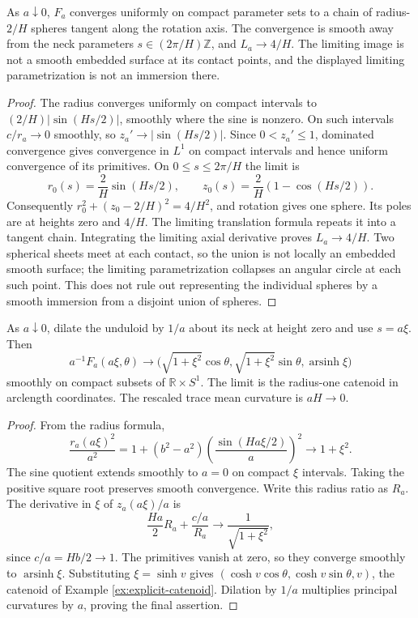 \begin{proposition}\label{prop:unduloid-sphere-chain-limit}
As $a\downarrow0$, $F_a$ converges uniformly on compact parameter sets to a chain of radius-$2/H$ spheres tangent along the rotation axis. The convergence is smooth away from the neck parameters $s\in(2\pi/H)\mathbb Z$, and $L_a\to4/H$. The limiting image is not a smooth embedded surface at its contact points, and the displayed limiting parametrization is not an immersion there.
\end{proposition}
\begin{proof}
The radius converges uniformly on compact intervals to $(2/H)|\sin(Hs/2)|$, smoothly where the sine is nonzero. On such intervals $c/r_a\to0$ smoothly, so $z_a'\to|\sin(Hs/2)|$. Since $0<z_a'\le1$, dominated convergence gives convergence in $L^1$ on compact intervals and hence uniform convergence of its primitives. On $0\le s\le2\pi/H$ the limit is
\[
 r_0(s)=\frac2H\sin(Hs/2),\qquad z_0(s)=\frac2H(1-\cos(Hs/2)).
\]
Consequently $r_0^2+(z_0-2/H)^2=4/H^2$, and rotation gives one sphere. Its poles are at heights zero and $4/H$. The limiting translation formula repeats it into a tangent chain. Integrating the limiting axial derivative proves $L_a\to4/H$. Two spherical sheets meet at each contact, so the union is not locally an embedded smooth surface; the limiting parametrization collapses an angular circle at each such point. This does not rule out representing the individual spheres by a smooth immersion from a disjoint union of spheres.
\end{proof}

\begin{proposition}\label{prop:unduloid-neck-catenoid-limit}
As $a\downarrow0$, dilate the unduloid by $1/a$ about its neck at height zero and use $s=a\xi$. Then
\[
 a^{-1}F_a(a\xi,\theta)\longrightarrow
 \big(\sqrt{1+\xi^2}\cos\theta,\sqrt{1+\xi^2}\sin\theta,\operatorname{arsinh}\xi\big)
\]
smoothly on compact subsets of $\mathbb R\times S^1$. The limit is the radius-one catenoid in arclength coordinates. The rescaled trace mean curvature is $aH\to0$.
\end{proposition}
\begin{proof}
From the radius formula,
\[
 \frac{r_a(a\xi)^2}{a^2}=1+(b^2-a^2)\left(\frac{\sin(Ha\xi/2)}a\right)^2\longrightarrow1+\xi^2.
\]
The sine quotient extends smoothly to $a=0$ on compact $\xi$ intervals. Taking the positive square root preserves smooth convergence. Write this radius ratio as $R_a$. The derivative in $\xi$ of $z_a(a\xi)/a$ is
\[
 \frac{Ha}{2}R_a+\frac{c/a}{R_a}\longrightarrow\frac1{\sqrt{1+\xi^2}},
\]
since $c/a=Hb/2\to1$. The primitives vanish at zero, so they converge smoothly to $\operatorname{arsinh}\xi$. Substituting $\xi=\sinh v$ gives $(\cosh v\cos\theta,\cosh v\sin\theta,v)$, the catenoid of Example \ref{ex:explicit-catenoid}. Dilation by $1/a$ multiplies principal curvatures by $a$, proving the final assertion.
\end{proof}

